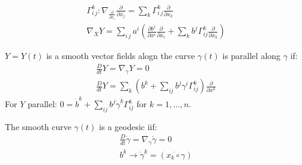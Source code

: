     \begin{ddef}
        \begin{gather*}
            \Gamma_{i\,j}^k: \nabla_{ \frac{\partial}{\partial x_i}} \frac{\partial}{\partial x_j} = \sum_k \Gamma_{i\,j}^k  \frac{\partial}{\partial x_k}\\
            \nabla_X Y = \sum_{i\, j} a^i\left(  \frac{\partial b^j}{\partial x^i}  \frac{\partial}{\partial x_i} + \sum_k b^j \Gamma_{ij}^k  \frac{\partial}{\partial x_k}\right)
        \end{gather*}
    \end{ddef}
    $Y= Y(t)$ is a smooth vector fields alogn the curve $\gamma(t)$ is parallel along $\gamma$ if:
    \begin{gather*}
        \frac{D}{dt}Y = \nabla_{\dot \gamma}Y =0\\
        \frac{D}{dt}Y = \sum_k \left( b^k + \sum_{ij} b^j\gamma^i \Gamma_{ij}^k \right) \frac{\partial}{\partial x^k} 
    \end{gather*}
    For $Y$ parallel: $0=\dot b^k + \sum_{ij} b^j \dot \gamma^k  \Gamma_{ij}^k$ for $k=1,\ldots, n$.
    \begin{ddef}
        The smooth curve $\gamma(t)$ is a geodesic iif:
        \begin{gather*}
            \frac{D}{dt} \dot \gamma = \nabla_{\dot \gamma} \dot \gamma =0\\
            b^k \longrightarrow \dot \gamma^k = (\dot{x_k\circ \gamma})
        \end{gather*}
    \end{ddef}
